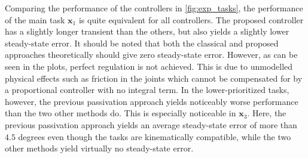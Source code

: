 \documentclass[../main.tex]{subfiles}
\begin{document}
Comparing the performance of the controllers in \cref{fig:exp_tasks}, the performance of the main task $\bm{x}_1$ is quite equivalent for all controllers. The proposed controller has a slightly longer transient than the others, but also yields a slightly lower steady-state error. 
It should be noted that both the classical and proposed approaches theoretically should give zero steady-state error. However, as can be seen in the plots, perfect regulation is not achieved. This is due to unmodelled physical effects such as friction in the joints which cannot be compensated for by a proportional controller with no integral term. 
In the lower-prioritized tasks, however, the previous passivation approach yields noticeably worse performance than the two other methods do. This is especially noticeable in $\bm{x}_3$.
Here, the previous passivation approach yields an average steady-state error of more than $4.5$ degrees even though the tasks are kinematically compatible, while the two other methods yield virtually no steady-state error.
\end{document}
